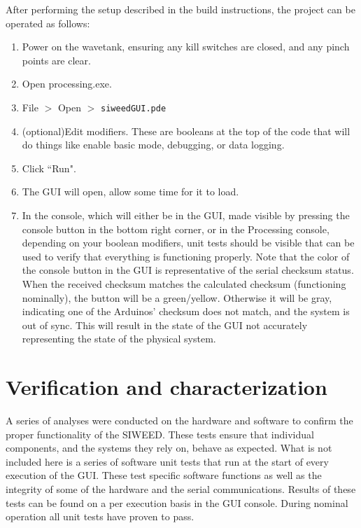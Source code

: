 \documentclass[11pt, letterpaper]{article}
\begin{document}
After performing the setup described in the build instructions, the project can be operated as follows:
\begin{enumerate}
\item Power on the wavetank, ensuring any kill switches are closed, and any pinch points are clear.
\item Open processing.exe.
\item File $>$ Open $>$ \texttt{siweedGUI.pde} 
\item (optional)Edit modifiers. These are booleans at the top of the code that will do things like enable basic mode, debugging, or data logging.
\item Click ``Run".
\item The GUI will open, allow some time for it to load.
\item In the console, which will either be in the GUI, made visible by pressing the console button in the bottom right corner, or in the Processing console, depending on your boolean modifiers, unit tests should be visible that can be used to verify that everything is functioning properly. 
Note that the color of the console button in the GUI is representative of the serial checksum status.
When the received checksum matches the calculated checksum (functioning nominally), the button will be a green/yellow.
Otherwise it will be gray, indicating one of the Arduinos' checksum does not match, and the system is out of sync. 
This will result in the state of the GUI not accurately representing the state of the physical system.
\end{enumerate}

\section{Verification and characterization}
A series of analyses were conducted on the hardware and software to confirm the proper functionality of the SIWEED.
These tests ensure that individual components, and the systems they rely on, behave as expected.
What is not included here is a series of software unit tests that run at the start of every execution of the GUI.
These test specific software functions as well as the integrity of some of the hardware and the serial communications. 
Results of these tests can be found on a per execution basis in the GUI console.
During nominal operation all unit tests have proven to pass.
\end{document}
